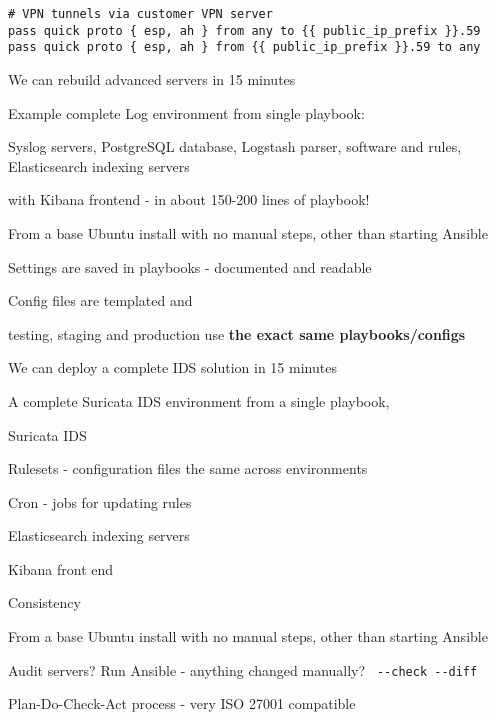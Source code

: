 \documentclass[17pt,Screen16to9,footrule]{foils}
\begin{document}

{\small\begin{verbatim}
# VPN tunnels via customer VPN server
pass quick proto { esp, ah } from any to {{ public_ip_prefix }}.59
pass quick proto { esp, ah } from {{ public_ip_prefix }}.59 to any
\end{verbatim}}


\begin{list1}
\item We can rebuild advanced servers in 15 minutes
\item Example complete Log environment from single playbook:
\begin{list2}
\item Syslog servers, PostgreSQL database, Logstash parser, software and rules, Elasticsearch indexing servers
\item with Kibana frontend - in about 150-200 lines of playbook!
\end{list2}
\item From a base Ubuntu install with no manual steps, other than starting Ansible
\item Settings are saved in playbooks - documented and readable
\item Config files are templated and
\item testing, staging and production use {\bf the exact same playbooks/configs}
\end{list1}



\begin{list1}
\item We can deploy a complete IDS solution in 15 minutes
\item A complete Suricata IDS environment from a single playbook,
\begin{list2}
\item Suricata IDS
\item Rulesets - configuration files the same across environments
\item Cron - jobs for updating rules
\item Elasticsearch indexing servers
\item Kibana front end
\end{list2}
\item Consistency
\item From a base Ubuntu install with no manual steps, other than starting Ansible

\item Audit servers? Run Ansible - anything changed manually? \verb$ --check --diff$
\vskip 5mm
\item Plan-Do-Check-Act process - very ISO 27001 compatible
\end{list1}
\end{document}
